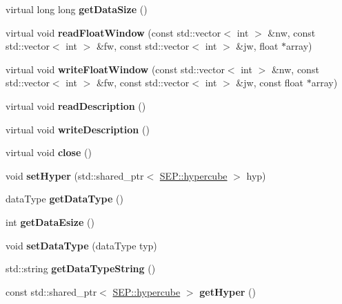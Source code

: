 \begin{DoxyCompactItemize}
virtual long long {\bfseries get\+Data\+Size} ()
\item 
\mbox{\label{class_s_e_p_1_1generic_reg_file_a1d9b19824069d55f62378946f705aa67}} 
virtual void {\bfseries read\+Float\+Window} (const std\+::vector$<$ int $>$ \&nw, const std\+::vector$<$ int $>$ \&fw, const std\+::vector$<$ int $>$ \&jw, float $\ast$array)
\item 
\mbox{\label{class_s_e_p_1_1generic_reg_file_a0fd2dcb4c5a6b851a466bdc199285afa}} 
virtual void {\bfseries write\+Float\+Window} (const std\+::vector$<$ int $>$ \&nw, const std\+::vector$<$ int $>$ \&fw, const std\+::vector$<$ int $>$ \&jw, const float $\ast$array)
\item 
\mbox{\label{class_s_e_p_1_1generic_reg_file_a694fb25fa7b60fab7ac17c44ddeec134}} 
virtual void {\bfseries read\+Description} ()
\item 
\mbox{\label{class_s_e_p_1_1generic_reg_file_a2584c55b4fd07fc1de432cb1e690805c}} 
virtual void {\bfseries write\+Description} ()
\item 
\mbox{\label{class_s_e_p_1_1generic_reg_file_a878458efe54b19bc5ff23cf3a19e801e}} 
virtual void {\bfseries close} ()
\item 
\mbox{\label{class_s_e_p_1_1generic_reg_file_aa248adc254ee43d6ce43df58ec28eb6d}} 
void {\bfseries set\+Hyper} (std\+::shared\+\_\+ptr$<$ \hyperlink{class_s_e_p_1_1hypercube}{S\+E\+P\+::hypercube} $>$ hyp)
\item 
\mbox{\label{class_s_e_p_1_1generic_reg_file_a16044771e180d12c5f86db0d19323b29}} 
data\+Type {\bfseries get\+Data\+Type} ()
\item 
\mbox{\label{class_s_e_p_1_1generic_reg_file_a3aa5828c2827506c30bfee3c014c466e}} 
int {\bfseries get\+Data\+Esize} ()
\item 
\mbox{\label{class_s_e_p_1_1generic_reg_file_abc37da879bb332d4baff94aea464aa88}} 
void {\bfseries set\+Data\+Type} (data\+Type typ)
\item 
\mbox{\label{class_s_e_p_1_1generic_reg_file_ac079879ce61da333dbb5c54b614c9f3b}} 
std\+::string {\bfseries get\+Data\+Type\+String} ()
\item 
\mbox{\label{class_s_e_p_1_1generic_reg_file_ab5e73db8e6a3cb96144f00db94e15028}} 
const std\+::shared\+\_\+ptr$<$ \hyperlink{class_s_e_p_1_1hypercube}{S\+E\+P\+::hypercube} $>$ {\bfseries get\+Hyper} ()
\end{DoxyCompactItemize}
